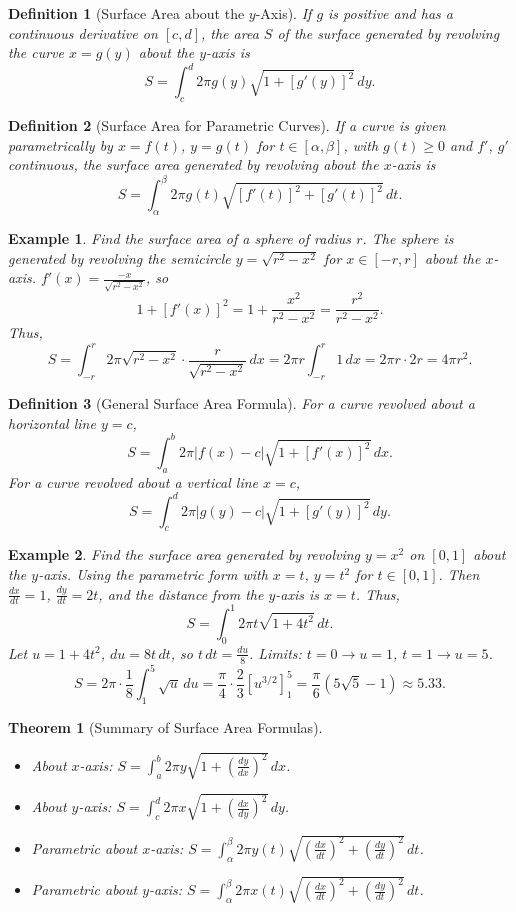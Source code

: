 \documentclass[11pt,a4paper]{article}
\newtheorem{example}{Example}
\newtheorem{theorem}{Theorem}
\newtheorem{definition}{Definition}
\begin{document}
\begin{definition}[Surface Area about the $y$-Axis]
If $g$ is positive and has a continuous derivative on $[c, d]$, the area $S$ of the surface generated by revolving the curve $x = g(y)$ about the $y$-axis is
\[
S = \int_c^d 2\pi g(y) \sqrt{1 + [g'(y)]^2} \, dy.
\]
\end{definition}
\begin{definition}[Surface Area for Parametric Curves]
If a curve is given parametrically by $x = f(t)$, $y = g(t)$ for $t \in [\alpha, \beta]$, with $g(t) \geq 0$ and $f'$, $g'$ continuous, the surface area generated by revolving about the $x$-axis is
\[
S = \int_{\alpha}^{\beta} 2\pi g(t) \sqrt{[f'(t)]^2 + [g'(t)]^2} \, dt.
\]
\end{definition}
\begin{example}
Find the surface area of a sphere of radius $r$.
The sphere is generated by revolving the semicircle $y = \sqrt{r^2 - x^2}$ for $x \in [-r, r]$ about the $x$-axis.
$f'(x) = \frac{-x}{\sqrt{r^2 - x^2}}$, so
\[
1 + [f'(x)]^2 = 1 + \frac{x^2}{r^2 - x^2} = \frac{r^2}{r^2 - x^2}.
\]
Thus,
\[
S = \int_{-r}^r 2\pi \sqrt{r^2 - x^2} \cdot \frac{r}{\sqrt{r^2 - x^2}} \, dx = 2\pi r \int_{-r}^r 1 \, dx = 2\pi r \cdot 2r = 4\pi r^2.
\]
\end{example}
\begin{definition}[General Surface Area Formula]
For a curve revolved about a horizontal line $y = c$,
\[
S = \int_a^b 2\pi |f(x) - c| \sqrt{1 + [f'(x)]^2} \, dx.
\]
For a curve revolved about a vertical line $x = c$,
\[
S = \int_c^d 2\pi |g(y) - c| \sqrt{1 + [g'(y)]^2} \, dy.
\]
\end{definition}
\begin{example}
Find the surface area generated by revolving $y = x^2$ on $[0, 1]$ about the $y$-axis.
Using the parametric form with $x = t$, $y = t^2$ for $t \in [0, 1]$. Then $\frac{dx}{dt} = 1$, $\frac{dy}{dt} = 2t$, and the distance from the $y$-axis is $x = t$. Thus,
\[
S = \int_0^1 2\pi t \sqrt{1 + 4t^2} \, dt.
\]
Let $u = 1 + 4t^2$, $du = 8t \, dt$, so $t \, dt = \frac{du}{8}$. Limits: $t = 0 \to u = 1$, $t = 1 \to u = 5$.
\[
S = 2\pi \cdot \frac{1}{8} \int_1^5 \sqrt{u} \, du = \frac{\pi}{4} \cdot \frac{2}{3} [u^{3/2}]_1^5 = \frac{\pi}{6} (5\sqrt{5} - 1) \approx 5.33.
\]
\end{example}
\begin{theorem}[Summary of Surface Area Formulas]
\begin{itemize}
\item About $x$-axis: $S = \displaystyle \int_a^b 2\pi y \sqrt{1 + \left( \frac{dy}{dx} \right)^2} \, dx$.
\item About $y$-axis: $S = \displaystyle \int_c^d 2\pi x \sqrt{1 + \left( \frac{dx}{dy} \right)^2} \, dy$.
\item Parametric about $x$-axis: $S = \displaystyle \int_{\alpha}^{\beta} 2\pi y(t) \sqrt{\left( \frac{dx}{dt} \right)^2 + \left( \frac{dy}{dt} \right)^2} \, dt$.
\item Parametric about $y$-axis: $S = \displaystyle \int_{\alpha}^{\beta} 2\pi x(t) \sqrt{\left( \frac{dx}{dt} \right)^2 + \left( \frac{dy}{dt} \right)^2} \, dt$.
\end{itemize}
\end{theorem}
\end{document}
